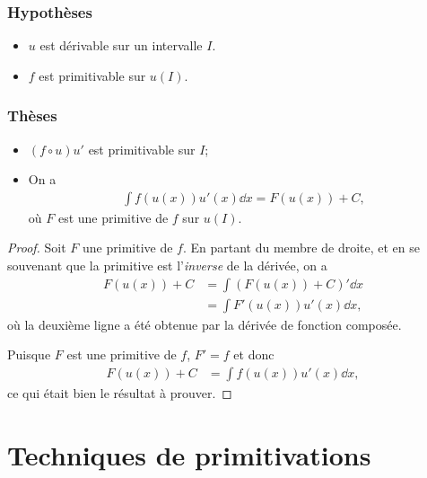 \documentclass[main.tex]{subfiles}
\begin{document}
\begin{proposition}

    \subsubsection{Hypothèses}
    \begin{itemize}
        \item $u$ est dérivable sur un intervalle $I$.
        \item $f$ est primitivable sur $u(I)$.
    \end{itemize}

    \subsubsection{Thèses}
    \begin{itemize}
        \item $(f \circ u) u'$ est primitivable sur $I$;
        \item On a
            \begin{align}
                \int f(u(x)) u'(x) \dd x
                = F(u(x)) + C,
            \end{align}
            où $F$ est une primitive de $f$ sur $u(I)$.
    \end{itemize}
\end{proposition}
\begin{proof}
    Soit $F$ une primitive de $f$.
    En partant du membre de droite,
    et en se souvenant que la primitive est l'\emph{inverse} de la dérivée,
    on a
    \begin{align}
        F(u(x)) + C
        &= \int (F(u(x)) + C)' \dd x\\
        &= \int F'(u(x)) u'(x) \dd x,
    \end{align}
    où la deuxième ligne a été obtenue par la dérivée de fonction composée.

    Puisque $F$ est une primitive de $f$, $F' = f$ et donc
    \begin{align}
        F(u(x)) + C
        &= \int f(u(x)) u'(x) \dd x,
    \end{align}
    ce qui était bien le résultat à prouver.
\end{proof}

\section{Techniques de primitivations}
\end{document}
